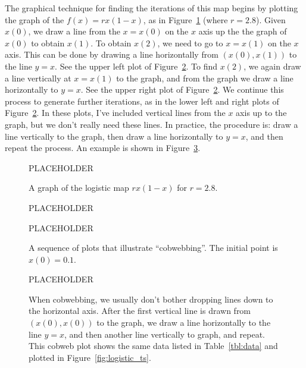 The graphical technique for finding the iterations of this map
begins by plotting the graph of the $f(x) = rx(1-x)$, as in
Figure~\ref{fig:logisticmap_example} (where $r=2.8$).
Given $x(0)$, we draw a line from the $x=x(0)$ on the $x$
axis up the the graph of $x(0)$ to obtain $x(1)$.
To obtain $x(2)$, we need to go to $x=x(1)$ on the $x$ axis.
This can be done by drawing a line horizontally from
$(x(0),x(1))$ to the line $y=x$.
See the upper left plot of Figure~\ref{fig:cobwebsequence}.
To find $x(2)$, we again draw a line vertically
at $x=x(1)$ to the graph, and from the graph we draw a 
line horizontally to $y=x$.
See the upper right plot of Figure~\ref{fig:cobwebsequence}.
We continue this process to generate further iterations,
as in the lower left and right plots of
Figure~\ref{fig:cobwebsequence}.
In these plots, I've included vertical lines from the $x$ axis
up to the graph, but we don't really need these lines.
In practice, the procedure is: 
draw a line vertically
to the graph, then 
draw a line horizontally to $y=x$,  and then repeat
the process.
An example is shown in Figure~\ref{fig:cobwebfinal}.

\begin{figure}
\centerline{%
PLACEHOLDER
}
\caption{A graph of the logistic map $rx(1-x)$ for $r=2.8$.}
\label{fig:logisticmap_example}
\end{figure}
%
\begin{figure}
\centerline{%
PLACEHOLDER
}
\centerline{%
PLACEHOLDER
}
\caption{A sequence of plots that illustrate
``cobwebbing''. The initial point is $x(0)=0.1$.}
\label{fig:cobwebsequence}
\end{figure}
%
\begin{figure}
\centerline{%
PLACEHOLDER
}
\caption{When cobwebbing, we usually don't bother dropping
lines down to the horizontal axis. After the first vertical
line is drawn from $(x(0),x(0))$ to the graph, we draw
a line horizontally to the line
$y=x$, and then another line vertically to graph, and repeat.
This cobweb plot shows
the same data listed in Table~\ref{tbl:data} and plotted in
Figure~\ref{fig:logistic_ts}.}
\label{fig:cobwebfinal} 
\end{figure}
%


